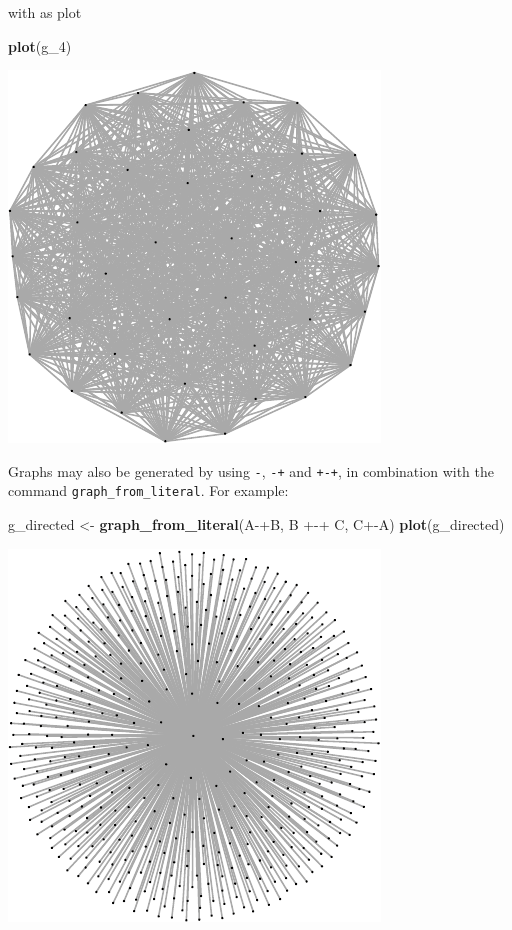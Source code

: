\documentclass[]{article}
\newenvironment{Shaded}{\begin{snugshade}}{\end{snugshade}}
\newcommand{\KeywordTok}[1]{\textcolor[rgb]{0.13,0.29,0.53}{\textbf{{#1}}}}
\newcommand{\StringTok}[1]{\textcolor[rgb]{0.31,0.60,0.02}{{#1}}}
\newcommand{\NormalTok}[1]{{#1}}
\begin{document}
with as plot

\begin{Shaded}
\begin{Highlighting}[]
\KeywordTok{plot}\NormalTok{(g_4)}
\end{Highlighting}
\end{Shaded}

\includegraphics{ResearchTools_files/figure-latex/unnamed-chunk-43-1.pdf}

Graphs may also be generated by using \texttt{-}, \texttt{-+} and
\texttt{+-+}, in combination with the command
\texttt{graph\_from\_literal}. For example:

\begin{Shaded}
\begin{Highlighting}[]
\NormalTok{g_directed <-}\StringTok{ }\KeywordTok{graph_from_literal}\NormalTok{(A-+B, B +-+}\StringTok{ }\NormalTok{C, C+-A)}
\KeywordTok{plot}\NormalTok{(g_directed)}
\end{Highlighting}
\end{Shaded}

\includegraphics{ResearchTools_files/figure-latex/unnamed-chunk-44-1.pdf}
\end{document}
